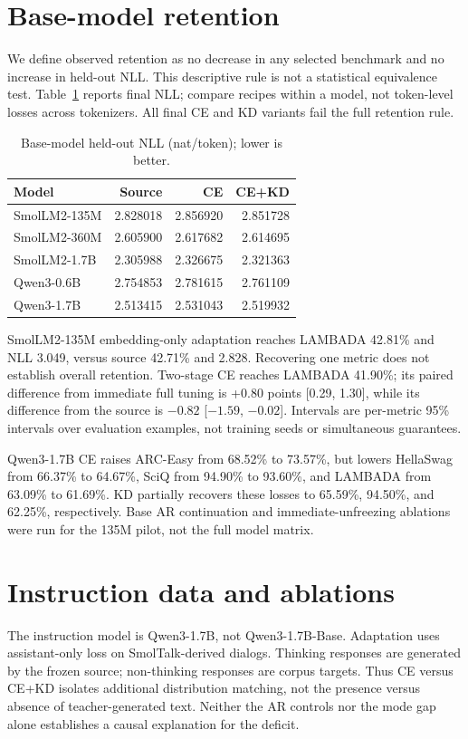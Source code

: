\section{Base-model retention}\label{app:base}
We define observed retention as no decrease in any selected benchmark and no increase in held-out NLL. This descriptive rule is not a statistical equivalence test. Table~\ref{tab:nll} reports final NLL; compare recipes within a model, not token-level losses across tokenizers. All final CE and KD variants fail the full retention rule.

\begin{table}[h]
\centering\small
\begin{tabular}{lrrr}
\toprule
Model & Source & CE & CE+KD\\
\midrule
SmolLM2-135M & 2.828018 & 2.856920 & 2.851728\\
SmolLM2-360M & 2.605900 & 2.617682 & 2.614695\\
SmolLM2-1.7B & 2.305988 & 2.326675 & 2.321363\\
Qwen3-0.6B & 2.754853 & 2.781615 & 2.761109\\
Qwen3-1.7B & 2.513415 & 2.531043 & 2.519932\\
\bottomrule
\end{tabular}
\caption{Base-model held-out NLL (nat/token); lower is better.}
\label{tab:nll}
\end{table}

SmolLM2-135M embedding-only adaptation reaches LAMBADA 42.81\% and NLL 3.049, versus source 42.71\% and 2.828. Recovering one metric does not establish overall retention. Two-stage CE reaches LAMBADA 41.90\%; its paired difference from immediate full tuning is +0.80 points [0.29, 1.30], while its difference from the source is $-0.82$ [$-1.59$, $-0.02$]. Intervals are per-metric 95\% intervals over evaluation examples, not training seeds or simultaneous guarantees.

Qwen3-1.7B CE raises ARC-Easy from 68.52\% to 73.57\%, but lowers HellaSwag from 66.37\% to 64.67\%, SciQ from 94.90\% to 93.60\%, and LAMBADA from 63.09\% to 61.69\%. KD partially recovers these losses to 65.59\%, 94.50\%, and 62.25\%, respectively. Base AR continuation and immediate-unfreezing ablations were run for the 135M pilot, not the full model matrix.

\section{Instruction data and ablations}
The instruction model is Qwen3-1.7B, not Qwen3-1.7B-Base. Adaptation uses assistant-only loss on SmolTalk-derived dialogs. Thinking responses are generated by the frozen source; non-thinking responses are corpus targets. Thus CE versus CE+KD isolates additional distribution matching, not the presence versus absence of teacher-generated text. Neither the AR controls nor the mode gap alone establishes a causal explanation for the deficit.

